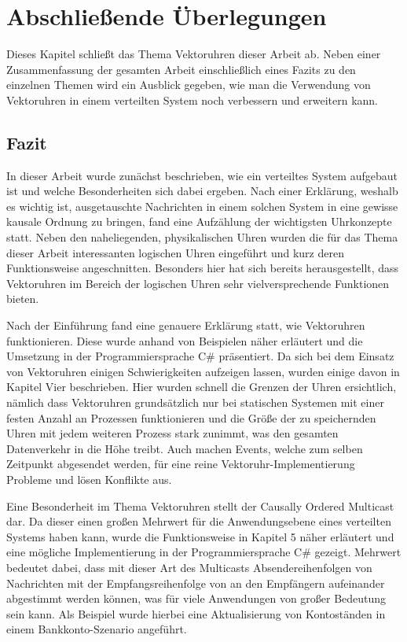 \section{Abschließende Überlegungen}
\label{cap:schluss}
Dieses Kapitel schließt das Thema Vektoruhren dieser Arbeit ab. Neben einer Zusammenfassung der gesamten Arbeit einschließlich eines Fazits zu den einzelnen Themen wird ein Ausblick gegeben, wie man die Verwendung von Vektoruhren in einem verteilten System noch verbessern und erweitern kann.
\subsection{Fazit}
In dieser Arbeit wurde zunächst beschrieben, wie ein verteiltes System aufgebaut ist und welche Besonderheiten sich dabei ergeben. Nach einer Erklärung, weshalb es wichtig ist, ausgetauschte Nachrichten in einem solchen System in eine gewisse kausale Ordnung zu bringen, fand eine Aufzählung der wichtigsten Uhrkonzepte statt. Neben den naheliegenden, physikalischen Uhren wurden die für das Thema dieser Arbeit interessanten logischen Uhren eingeführt und kurz deren Funktionsweise angeschnitten. Besonders hier hat sich bereits herausgestellt, dass Vektoruhren im Bereich der logischen Uhren sehr vielversprechende Funktionen bieten.

Nach der Einführung fand eine genauere Erklärung statt, wie Vektoruhren funktionieren. Diese wurde anhand von Beispielen näher erläutert und die Umsetzung in der Programmiersprache C\# präsentiert. Da sich bei dem Einsatz von Vektoruhren einigen Schwierigkeiten aufzeigen lassen, wurden einige davon in Kapitel Vier beschrieben. Hier wurden schnell die Grenzen der Uhren ersichtlich, nämlich dass Vektoruhren grundsätzlich nur bei statischen Systemen mit einer festen Anzahl an Prozessen funktionieren und die Größe der zu speichernden Uhren mit jedem weiteren Prozess stark zunimmt, was den gesamten Datenverkehr in die Höhe treibt. Auch machen Events, welche zum selben Zeitpunkt abgesendet werden, für eine reine Vektoruhr-Implementierung Probleme und lösen Konflikte aus.

Eine Besonderheit im Thema Vektoruhren stellt der Causally Ordered Multicast dar. Da dieser einen großen Mehrwert für die Anwendungsebene eines verteilten Systems haben kann, wurde die Funktionsweise in Kapitel 5 näher erläutert und eine mögliche Implementierung in der Programmiersprache C\# gezeigt. Mehrwert bedeutet dabei, dass mit dieser Art des Multicasts Absendereihenfolgen von Nachrichten mit der Empfangsreihenfolge von an den Empfängern aufeinander abgestimmt werden können, was für viele Anwendungen von großer Bedeutung sein kann. Als Beispiel wurde hierbei eine Aktualisierung von Kontoständen in einem Bankkonto-Szenario angeführt.


